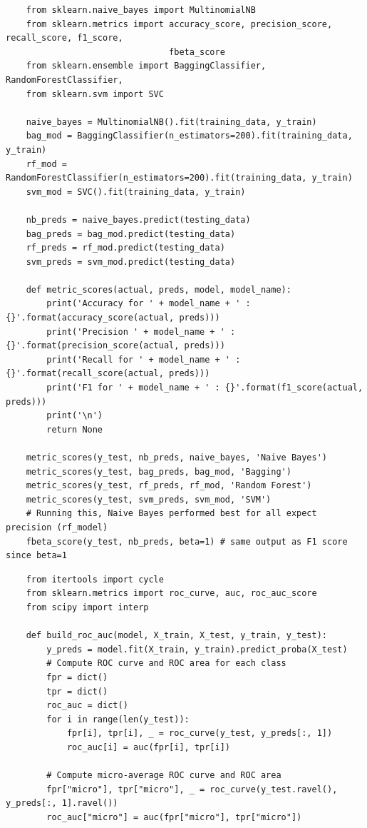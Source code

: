 \documentclass[11pt, a4paper]{article}
\begin{document}
\begin{spacing}{1.1}
\begin{lstlisting}
	from sklearn.naive_bayes import MultinomialNB
	from sklearn.metrics import accuracy_score, precision_score, recall_score, f1_score, 
	                            fbeta_score
	from sklearn.ensemble import BaggingClassifier, RandomForestClassifier, 
	from sklearn.svm import SVC
	
	naive_bayes = MultinomialNB().fit(training_data, y_train)
	bag_mod = BaggingClassifier(n_estimators=200).fit(training_data, y_train)
	rf_mod = RandomForestClassifier(n_estimators=200).fit(training_data, y_train)
	svm_mod = SVC().fit(training_data, y_train)
	
	nb_preds = naive_bayes.predict(testing_data)
	bag_preds = bag_mod.predict(testing_data)
	rf_preds = rf_mod.predict(testing_data)
	svm_preds = svm_mod.predict(testing_data)
	
	def metric_scores(actual, preds, model, model_name):
		print('Accuracy for ' + model_name + ' : {}'.format(accuracy_score(actual, preds)))
		print('Precision ' + model_name + ' : {}'.format(precision_score(actual, preds)))
		print('Recall for ' + model_name + ' : {}'.format(recall_score(actual, preds)))
		print('F1 for ' + model_name + ' : {}'.format(f1_score(actual, preds)))
		print('\n')
		return None
	
	metric_scores(y_test, nb_preds, naive_bayes, 'Naive Bayes')
	metric_scores(y_test, bag_preds, bag_mod, 'Bagging')
	metric_scores(y_test, rf_preds, rf_mod, 'Random Forest')
	metric_scores(y_test, svm_preds, svm_mod, 'SVM')
	# Running this, Naive Bayes performed best for all expect precision (rf_model)
	fbeta_score(y_test, nb_preds, beta=1) # same output as F1 score since beta=1 \end{lstlisting} \newpage

	\begin{lstlisting}
	from itertools import cycle
	from sklearn.metrics import roc_curve, auc, roc_auc_score
	from scipy import interp
	
	def build_roc_auc(model, X_train, X_test, y_train, y_test):
		y_preds = model.fit(X_train, y_train).predict_proba(X_test)
		# Compute ROC curve and ROC area for each class
		fpr = dict()
		tpr = dict()
		roc_auc = dict()
		for i in range(len(y_test)):
			fpr[i], tpr[i], _ = roc_curve(y_test, y_preds[:, 1])
			roc_auc[i] = auc(fpr[i], tpr[i])
		
		# Compute micro-average ROC curve and ROC area
		fpr["micro"], tpr["micro"], _ = roc_curve(y_test.ravel(), y_preds[:, 1].ravel())
		roc_auc["micro"] = auc(fpr["micro"], tpr["micro"])
		

\end{lstlisting}
\end{spacing}
\end{document}
